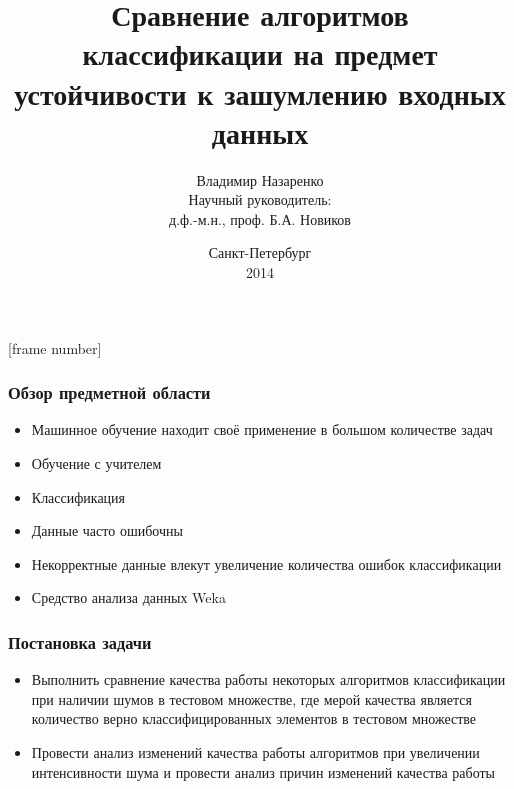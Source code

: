 \documentclass{beamer}
\begin{document}

\title[Сравнение алгоритмов классификации]{Сравнение алгоритмов классификации на предмет устойчивости к зашумлению входных данных}
\author[Владимир Назаренко]{Владимир Назаренко\\{\scriptsize Научный руководитель: \\ \vspace{-2mm} д.ф.-м.н., проф. Б.А. Новиков}}
\date{Санкт-Петербург\\ 2014}
\subject{Алгоритмы классификации}

\large
\frame{\titlepage}
[frame number]

\begin{frame}
    \frametitle{Обзор предметной области}
    \begin{itemize}
    	\item{Машинное обучение находит своё применение в большом количестве 				задач}
    	\item{Обучение с учителем}
    	\item{Классификация}
    	\item{Данные часто ошибочны}
	   	\item{Некорректные данные влекут увеличение количества ошибок 				классификации}
    	\item{Средство анализа данных Weka}
    \end{itemize}
  \end{frame}
  
  \begin{frame}
    \frametitle{Постановка задачи}
    \begin{itemize}

    	\item{Выполнить сравнение качества работы некоторых алгоритмов классификации при наличии шумов в тестовом множестве, где мерой качества является количество верно классифицированных элементов в тестовом множестве}
    	
    	\item{Провести анализ изменений качества работы алгоритмов при увеличении интенсивности шума и провести анализ причин изменений качества работы}
    	
    \end{itemize}
  \end{frame}
  
\end{document}
